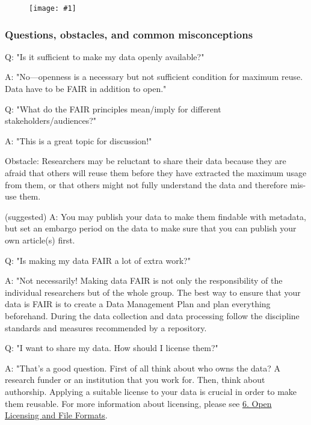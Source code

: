\documentclass{article}
\newlength{\imgwidth}
\newcommand\scaledgraphics[2]{%
                
\settowidth{\imgwidth}{\texttt{[image: \#1]}}%
                
\setlength{\imgwidth}{\minof{\imgwidth}{#2\textwidth}}%
                
\texttt{[image: \#1]}%
                
}
\begin{document}
\begin{figure}
\scaledgraphics{2b202773-ec41-4cde-8558-44800112ec6d.png}{1}
\label{F88177201}
\end{figure}


\subsubsection{Questions, obstacles, and common misconceptions}\label{questions-obstacles-and-common-misconceptions}



Q: "Is it sufficient to make my data openly available?"


A: "No—openness is a necessary but not sufficient condition for maximum reuse. Data have to be FAIR in addition to open."


Q: "What do the FAIR principles mean/imply for different stakeholders/audiences?"


A: "This is a great topic for discussion!"


Obstacle: Researchers may be reluctant to share their data because they are afraid that others will reuse them before they have extracted the maximum usage from them, or that others might not fully understand the data and therefore mis-use them.


(suggested) A: You may publish your data to make them findable with metadata, but set an embargo period on the data to make sure that you can publish your own article(s) first.


Q: "Is making my data FAIR a lot of extra work?"


A: "Not necessarily! Making data FAIR is not only the responsibility of the individual researchers but of the whole group. The best way to ensure that your data is FAIR is to create a Data Management Plan and plan everything beforehand. During the data collection and data processing follow the discipline standards and measures recommended by a repository.


Q: "I want to share my data. How should I license them?"


A: "That’s a good question. First of all think about who owns the data? A research funder or an institution that you work for. Then, think about authorship. Applying a suitable license to your data is crucial in order to make them reusable. For more information about licensing, please see \href{https://github.com/Open-Science-Training-Handbook/Open-Science-Training-Handbook_EN/tree/master/02OpenScienceBasics/06OpenLicensingAndFileFormats}{6. Open Licensing and File Formats}.
\end{document}

